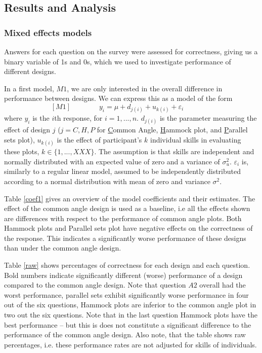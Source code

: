 \subsection{Results and Analysis}\label{results}
\subsubsection{Mixed effects models}
Answers for each question on the survey were assessed for correctness, giving us a binary variable of 1s and 0s, which we used to investigate performance of different designs. 

In a first model, $M1$, we are only interested in the overall difference in performance between designs. We can express this as a model of the form
\begin{equation}\label{model1}[M1]
\qquad\qquad y_i = \mu + d_{j(i)} + u_{k(i)} + \varepsilon_i \qquad\qquad
\end{equation}
where $y_i$ is the $i$th response, for $i = 1, ..., n$. $d_{j(i)}$ is the parameter measuring the effect of design $j$ ($j = C, H, P$ for \underline{C}ommon Angle, \underline{H}ammock plot, and \underline{P}arallel sets plot), $u_{k(i)}$ is the effect of participant's $k$ individual skills in evaluating these plots, $k \in \{1, ..., XXX\}$. The assumption is that skills are independent and normally distributed with an expected value of zero and a variance of $\sigma_u^2$.
$\varepsilon_i$ is, similarly to a regular linear model, assumed to be independently distributed according to a normal distribution with mean of zero and variance $\sigma^2$.

Table \ref{coef1} gives an overview of the model coefficients and their estimates. The effect of the common angle design is used as a baseline, i.e all the effects shown are differences with respect to the performance of common angle plots. Both Hammock plots and Parallel sets plot have negative effects on the correctness of the response. This indicates a significantly worse performance of these designs than under the common angle design.

Table \ref{raw} shows percentages of correctness for each design and each question. Bold numbers indicate significantly different (worse) performance of a design compared to the common angle design. Note that question $A2$ overall had the worst performance, parallel sets  exhibit significantly worse performance in four out of the six questions, Hammock plots are inferior to the common angle plot in two out the six questions. Note that in the last question Hammock plots have the best performance -- but this is does not  constitute a significant difference to the performance of the common angle design.
Also note, that the table shows raw percentages, i.e. these performance rates are not adjusted for skills of individuals. 

